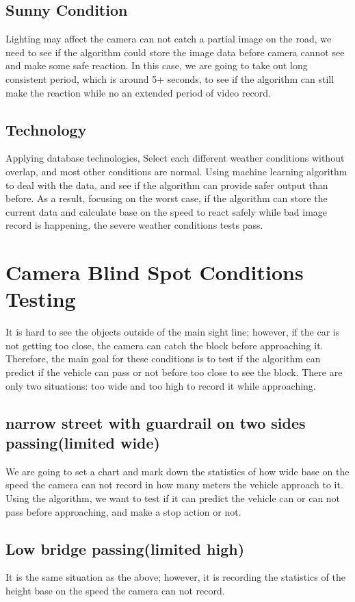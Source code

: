 \documentclass[10pt,draftclsnofoot,onecolumn,journal,compsoc]{IEEEtran}
\begin{document}
\subsection{Sunny Condition}
Lighting may affect the camera can not catch a partial image on the road, we need to see if the algorithm could store the image data before camera cannot see and make some safe reaction. In this case, we are going to take out long consistent period, which is around 5+ seconds, to see if the algorithm can still make the reaction while no an extended period of video record. 

\subsection{Technology}
Applying database technologies, Select each different weather conditions without overlap, and most other conditions are normal. Using machine learning algorithm to deal with the data, and see if the algorithm can provide safer output than before. As a result, focusing on the worst case, if the algorithm can store the current data and calculate base on the speed to react safely while bad image record is happening, the severe weather conditions tests pass.


\section{Camera Blind Spot Conditions Testing}
It is hard to see the objects outside of the main sight line; however, if the car is not getting too close, the camera can catch the block before approaching it. Therefore, the main goal for these conditions is to test if the algorithm can predict if the vehicle can pass or not before too close to see the block. There are only two situations: too wide and too high to record it while approaching.

\subsection{narrow street with guardrail on two sides passing(limited wide)}
We are going to set a chart and mark down the statistics of how wide base on the speed the camera can not record in how many meters the vehicle approach to it. Using the algorithm, we want to test if it can predict the vehicle can or can not pass before approaching, and make a stop action or not.

\subsection{Low bridge passing(limited high)}
It is the same situation as the above; however, it is recording the statistics of the height base on the speed the camera can not record. 
\end{document}
